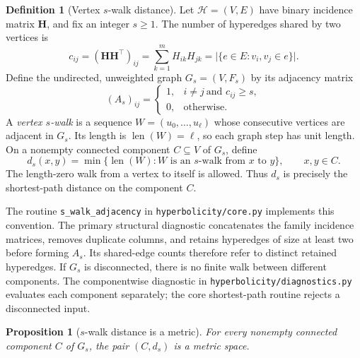 \documentclass{article}
\theoremstyle{definition}
\newtheorem{definition}{Definition}
\theoremstyle{plain}
\newtheorem{proposition}{Proposition}
\begin{document}
\begin{definition}[Vertex $s$-walk distance]
\label{def:s-walk-metric}
Let $\mathcal{H}=(V,E)$ have binary incidence matrix $\mathbf{H}$,
and fix an integer $s\geq1$. The number of hyperedges shared by two
vertices is
\[
  c_{ij}=(\mathbf{H}\mathbf{H}^{\top})_{ij}
        =\sum_{k=1}^{m}H_{ik}H_{jk}
        =\bigl|\{e\in E:v_i,v_j\in e\}\bigr|.
\]
Define the undirected, unweighted graph $G_s=(V,F_s)$ by its adjacency
matrix
\[
  (A_s)_{ij}=
  \begin{cases}
    1, & i\neq j\ \text{and }c_{ij}\geq s,\\
    0, & \text{otherwise}.
  \end{cases}
\]
A \emph{vertex $s$-walk} is a sequence $W=(u_0,\ldots,u_\ell)$
whose consecutive vertices are adjacent in $G_s$. Its length is
$\operatorname{len}(W)=\ell$, so each graph step has unit length.
On a nonempty connected component $C\subseteq V$ of $G_s$, define
\begin{equation}
  \label{eq:s-walk-distance}
  d_s(x,y)=\min\{\operatorname{len}(W):
                W\text{ is an }s\text{-walk from }x\text{ to }y\},
  \qquad x,y\in C.
\end{equation}
The length-zero walk from a vertex to itself is allowed. Thus $d_s$
is precisely the shortest-path distance on the component $C$.
\end{definition}

The routine \texttt{s\_walk\_adjacency} in
\texttt{hyperbolicity/core.py} implements this convention.
The primary structural diagnostic concatenates the family incidence
matrices, removes duplicate columns, and retains hyperedges of size at
least two before forming $A_s$. Its shared-edge counts therefore refer
to distinct retained hyperedges. If $G_s$ is disconnected, there is no
finite walk between different components. The componentwise diagnostic
in \texttt{hyperbolicity/diagnostics.py} evaluates each component
separately; the core shortest-path routine rejects a disconnected input.

\begin{proposition}[$s$-walk distance is a metric]
\label{prop:s-walk-metric}
For every nonempty connected component $C$ of $G_s$, the pair
$(C,d_s)$ is a metric space.
\end{proposition}
\end{document}
